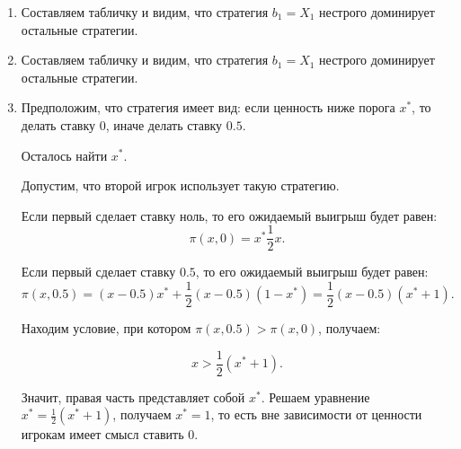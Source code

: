 \begin{enumerate}
\item Составляем табличку и видим, что стратегия $ b_{1}=X_{1} $ нестрого доминирует остальные стратегии.


\item  Составляем табличку и видим, что стратегия $ b_{1}=X_{1} $ нестрого доминирует остальные стратегии.

\item Предположим, что стратегия имеет вид: если ценность ниже порога $ x^{*} $, то делать ставку 0, иначе делать ставку $ 0.5 $.

Осталось найти $ x^{*} $.

Допустим, что второй игрок использует такую стратегию.

Если первый сделает ставку ноль, то его ожидаемый выигрыш будет равен:
\begin{equation}
\pi(x,0)=x^{*}\frac{1}{2}x.
\end{equation}

Если первый сделает ставку $0.5$, то его ожидаемый выигрыш будет равен:
\begin{equation}
\pi(x,0.5)=(x-0.5)x^{*}+\frac{1}{2}(x-0.5)(1-x^{*})=\frac{1}{2}(x-0.5)(x^{*}+1).
\end{equation}

Находим условие, при котором $ \pi(x,0.5)>\pi(x,0) $, получаем:

\begin{equation}
x>\frac{1}{2}(x^{*}+1).
\end{equation}

Значит, правая часть представляет собой $ x^{*} $. Решаем уравнение $x^{*}=\frac{1}{2}(x^{*}+1)  $, получаем $ x^{*}=1 $, то есть вне зависимости от ценности игрокам имеет смысл ставить 0.


\end{enumerate}
